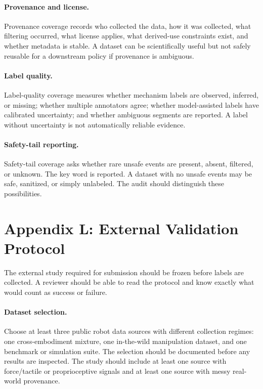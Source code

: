 \documentclass{article}
\begin{document}
\paragraph{Provenance and license.}
Provenance coverage records who collected the data, how it was collected, what filtering occurred, what license applies, what derived-use constraints exist, and whether metadata is stable. A dataset can be scientifically useful but not safely reusable for a downstream policy if provenance is ambiguous.

\paragraph{Label quality.}
Label-quality coverage measures whether mechanism labels are observed, inferred, or missing; whether multiple annotators agree; whether model-assisted labels have calibrated uncertainty; and whether ambiguous segments are reported. A label without uncertainty is not automatically reliable evidence.

\paragraph{Safety-tail reporting.}
Safety-tail coverage asks whether rare unsafe events are present, absent, filtered, or unknown. The key word is reported. A dataset with no unsafe events may be safe, sanitized, or simply unlabeled. The audit should distinguish these possibilities.

\section{Appendix L: External Validation Protocol}
The external study required for submission should be frozen before labels are collected. A reviewer should be able to read the protocol and know exactly what would count as success or failure.

\paragraph{Dataset selection.}
Choose at least three public robot data sources with different collection regimes: one cross-embodiment mixture, one in-the-wild manipulation dataset, and one benchmark or simulation suite. The selection should be documented before any results are inspected. The study should include at least one source with force/tactile or proprioceptive signals and at least one source with messy real-world provenance.
\end{document}
